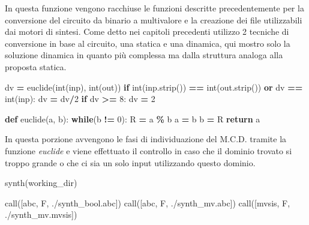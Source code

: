 \documentclass[
]{book}
\newenvironment{Shaded}{\begin{snugshade}}{\end{snugshade}}
\newcommand{\BuiltInTok}[1]{#1}
\newcommand{\ControlFlowTok}[1]{\textcolor[rgb]{0.13,0.29,0.53}{\textbf{#1}}}
\newcommand{\DecValTok}[1]{\textcolor[rgb]{0.00,0.00,0.81}{#1}}
\newcommand{\KeywordTok}[1]{\textcolor[rgb]{0.13,0.29,0.53}{\textbf{#1}}}
\newcommand{\NormalTok}[1]{#1}
\newcommand{\OperatorTok}[1]{\textcolor[rgb]{0.81,0.36,0.00}{\textbf{#1}}}
\newcommand{\StringTok}[1]{\textcolor[rgb]{0.31,0.60,0.02}{#1}}
\begin{document}
In questa funzione vengono racchiuse le funzioni descritte precedentemente per la conversione del circuito da binario a multivalore e la creazione dei file utilizzabili dai motori di sintesi. Come detto nei capitoli precedenti utilizzo 2 tecniche di conversione in base al circuito, una statica e una dinamica, qui mostro solo la soluzione dinamica in quanto più complessa ma dalla struttura analoga alla proposta statica.

\newpage

\begin{Shaded}
\begin{Highlighting}[]
\NormalTok{dv }\OperatorTok{=}\NormalTok{ euclide(}\BuiltInTok{int}\NormalTok{(inp), }\BuiltInTok{int}\NormalTok{(out))}
  \ControlFlowTok{if} \BuiltInTok{int}\NormalTok{(inp.strip()) }\OperatorTok{==} \BuiltInTok{int}\NormalTok{(out.strip())}
    \KeywordTok{or}\NormalTok{ dv }\OperatorTok{==} \BuiltInTok{int}\NormalTok{(inp):}
\NormalTok{    dv }\OperatorTok{=}\NormalTok{ dv}\OperatorTok{/}\DecValTok{2}
  \ControlFlowTok{if}\NormalTok{ dv }\OperatorTok{\textgreater{}=} \DecValTok{8}\NormalTok{:}
\NormalTok{    dv }\OperatorTok{=} \DecValTok{2} 

\KeywordTok{def}\NormalTok{ euclide(a, b):}
  \ControlFlowTok{while}\NormalTok{(b }\OperatorTok{!=} \DecValTok{0}\NormalTok{):}
\NormalTok{    R }\OperatorTok{=}\NormalTok{ a }\OperatorTok{\%}\NormalTok{ b}
\NormalTok{    a }\OperatorTok{=}\NormalTok{ b}
\NormalTok{    b }\OperatorTok{=}\NormalTok{ R}
  \ControlFlowTok{return}\NormalTok{ a}
\end{Highlighting}
\end{Shaded}

In questa porzione avvengono le fasi di individuazione del M.C.D. tramite la funzione \emph{euclide} e viene effettuato il controllo in caso che il dominio trovato si troppo grande o che ci sia un solo input utilizzando questo dominio.

\begin{Shaded}
\begin{Highlighting}[]
\NormalTok{synth(working\_dir)}

\NormalTok{call([}\StringTok{\textquotesingle{}abc\textquotesingle{}}\NormalTok{, }\StringTok{\textquotesingle{}{-}F\textquotesingle{}}\NormalTok{, }\StringTok{\textquotesingle{}./synth\_bool.abc\textquotesingle{}}\NormalTok{])}
\NormalTok{call([}\StringTok{\textquotesingle{}abc\textquotesingle{}}\NormalTok{, }\StringTok{\textquotesingle{}{-}F\textquotesingle{}}\NormalTok{, }\StringTok{\textquotesingle{}./synth\_mv.abc\textquotesingle{}}\NormalTok{])}
\NormalTok{call([}\StringTok{\textquotesingle{}mvsis\textquotesingle{}}\NormalTok{, }\StringTok{\textquotesingle{}{-}F\textquotesingle{}}\NormalTok{, }\StringTok{\textquotesingle{}./synth\_mv.mvsis\textquotesingle{}}\NormalTok{])}
\end{Highlighting}
\end{Shaded}
\end{document}
